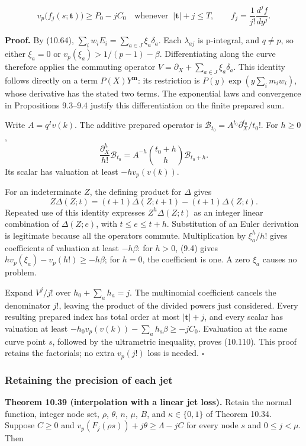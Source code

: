 \documentclass[
  11pt,
  a4paper,
]{article}
\begin{document}
\[
v_p\bigl(f_j(s;\boldsymbol t)\bigr)\ge P_0-jC_0
\quad\text{whenever }\ |\boldsymbol t|+j\le T,
\qquad
f_j=\frac1{j!}\frac{d^jf}{dy^j}.
\tag{10.110}
\]

\textbf{Proof.} By (10.64), \(\sum_iw_iE_i=\sum_{a\in J}\xi_a\delta_a\).
Each \(\lambda_{aj}\) is p-integral, and \(q\ne p\), so either
\(\xi_a=0\) or \(v_p(\xi_a)>1/(p-1)-\beta\). Differentiating along the
curve therefore applies the commuting operator
\(V=\partial_X+\sum_{a\in J}\xi_a\delta_a\). This identity follows
directly on a term \(P(X)Y^{\boldsymbol m}\): its restriction is
\(P(y)\exp(y\sum_i m_iw_i)\), whose derivative has the stated two terms.
The exponential laws and convergence in Propositions 9.3--9.4 justify
this differentiation on the finite prepared sum.

Write \(A=q^Iv(k)\). The additive prepared operator is
\(\mathcal B_{t_0}=A^{t_0}\partial_X^{t_0}/t_0!\). For \(h\ge0\), \[
\frac{\partial_X^h}{h!}\mathcal B_{t_0}
=A^{-h}\binom{t_0+h}{h}\mathcal B_{t_0+h}.
\] Its scalar has valuation at least \(-h v_p(v(k))\).

For an indeterminate \(Z\), the defining product for \(\Delta\) gives \[
Z\Delta(Z;t)=(t+1)\Delta(Z;t+1)-(t+1)\Delta(Z;t).
\] Repeated use of this identity expresses \(Z^h\Delta(Z;t)\) as an
integer linear combination of \(\Delta(Z;e)\), with \(t\le e\le t+h\).
Substitution of an Euler derivation is legitimate because all the
operators commute. Multiplication by \(\xi_a^h/h!\) gives coefficients
of valuation at least \(-h\beta\): for \(h>0\), (9.4) gives
\(h v_p(\xi_a)-v_p(h!)\ge-h\beta\); for \(h=0\), the coefficient is one.
A zero \(\xi_a\) causes no problem.

Expand \(V^j/j!\) over \(h_0+\sum_a h_a=j\). The multinomial coefficient
cancels the denominator \(j!\), leaving the product of the divided
powers just considered. Every resulting prepared index has total order
at most \(|\boldsymbol t|+j\), and every scalar has valuation at least
\(-h_0v_p(v(k))-\sum_a h_a\beta\ge-jC_0\). Evaluation at the same curve
point \(s\), followed by the ultrametric inequality, proves (10.110).
This proof retains the factorials; no extra \(v_p(j!)\) loss is needed.
\(\square\)

\subsubsection{Retaining the precision of each
jet}\label{retaining-the-precision-of-each-jet}

\textbf{Theorem 10.39 (interpolation with a linear jet loss).} Retain
the normal function, integer node set, \(\rho\), \(\theta\), \(n\),
\(\mu\), \(B\), and \(\kappa\in\{0,1\}\) of Theorem 10.34. Suppose
\(C\ge0\) and \(v_p(F_j(\rho s))+j\theta\ge\Lambda-jC\) for every node
\(s\) and \(0\le j<\mu\). Then
\end{document}
